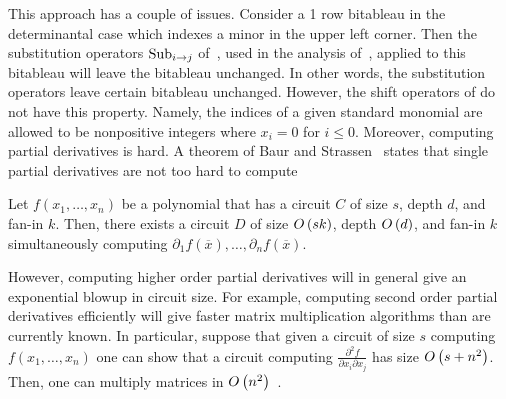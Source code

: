 \documentclass[letterpaper, 11pt]{amsart}
\begin{document}
This approach has a couple of issues.
Consider a 1 row bitableau in the determinantal case which indexes a minor in the upper left corner.
Then the substitution operators $\operatorname{Sub}_{i \to j}$ of~\cite{dCEP80}, used in the analysis of~\cite{AF22, DG25}, applied to this bitableau will leave the bitableau unchanged.
In other words, the substitution operators leave certain bitableau unchanged.
However, the shift operators of  do not have this property.
Namely, the indices of a given standard monomial are allowed to be nonpositive integers where $x_{i} = 0$ for $i \leq 0$.
Moreover, computing partial derivatives is hard.
A theorem of Baur and Strassen~\cite{BS83} states that single partial derivatives are not too hard to compute
\begin{prop}[{\cite{BS83}}]
  Let $f(x_1, \ldots, x_n)$ be a polynomial that has a circuit $C$ of size $s$, depth $d$, and fan-in $k$.
  Then, there exists a circuit $D$ of size $O\kern-0.0pt\left(sk\right)$, depth $O\kern-0.0pt\left(d\right)$, and fan-in $k$ simultaneously computing $\partial_1 f(\overline{x}), \ldots, \partial_{n} f(\overline{x})$.
\end{prop}
However, computing higher order partial derivatives will in general give an exponential blowup in circuit size.
For example, computing second order partial derivatives efficiently will give faster matrix multiplication algorithms than are currently known.
In particular, suppose that given a circuit of size $s$ computing $f(x_1, \ldots, x_n)$ one can show that a circuit computing $\frac{\partial^2 f}{\partial x_i \partial x_j}$ has size $O\kern-0.0pt\left(s + n^2\right)$.
Then, one can multiply matrices in $O\kern-0.0pt\left(n^2\right)$~\cite{CKW11}.

\printbibliography
\end{document}
